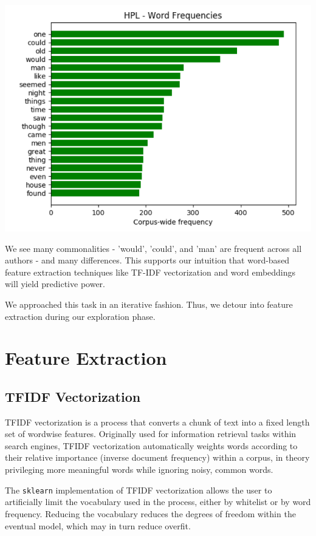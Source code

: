 \documentclass[8pt]{article}
\begin{document}
\vskip 0.2in
\includegraphics[scale=.40, center]{images/word_freq_hpl.png}
\vskip 0.2in

We see many commonalities - 'would', 'could', and 'man' are frequent across all authors - and many differences. This supports our intuition that word-based feature extraction techniques like TF-IDF vectorization and word embeddings will yield predictive power.

We approached this task in an iterative fashion. Thus, we detour into feature extraction during our exploration phase.

\section{Feature Extraction}

\subsection{TFIDF Vectorization}
TFIDF vectorization is a process that converts a chunk of text into
a fixed length set of wordwise features. Originally used for information retrieval tasks within search engines, TFIDF vectorization automatically weights words according to their relative importance (inverse document frequency) within a corpus, in theory privileging more meaningful words while ignoring noisy, common words.

The \texttt{sklearn} implementation of TFIDF vectorization allows the user to artificially limit the vocabulary used in the process, either by whitelist or by word frequency. Reducing the vocabulary reduces the degrees of freedom within the eventual model, which may in turn reduce overfit.
\end{document}
